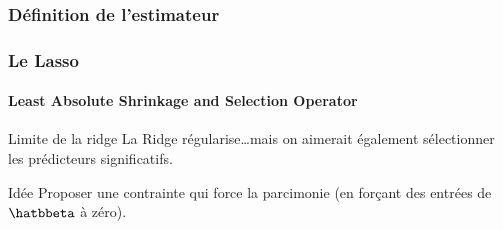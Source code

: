 \documentclass{beamer}\usepackage[]{graphicx}\usepackage[]{color}
\begin{document}
\subsubsection{Définition de l'estimateur}

\begin{frame}
  \frametitle{Le Lasso}
  \framesubtitle{Least Absolute Shrinkage and Selection Operator}

  \begin{block}{Limite de la ridge}
    La Ridge  régularise\dots mais on aimerait également sélectionner les prédicteurs significatifs.
  \end{block}

  \vfill

  \begin{block}{Idée}
    Proposer  une  contrainte  qui  force  la  \alert{parcimonie}  (en
    forçant des entrées de $\hatbbeta$ à zéro).
  \end{block}

  \vfill

\end{frame}


\end{document}
